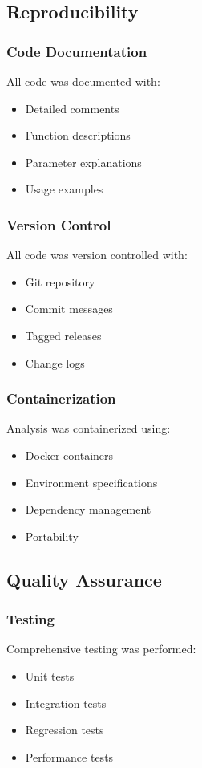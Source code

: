 \subsection{Reproducibility}

\subsubsection{Code Documentation}
All code was documented with:
\begin{itemize}
    \item Detailed comments
    \item Function descriptions
    \item Parameter explanations
    \item Usage examples
\end{itemize}

\subsubsection{Version Control}
All code was version controlled with:
\begin{itemize}
    \item Git repository
    \item Commit messages
    \item Tagged releases
    \item Change logs
\end{itemize}

\subsubsection{Containerization}
Analysis was containerized using:
\begin{itemize}
    \item Docker containers
    \item Environment specifications
    \item Dependency management
    \item Portability
\end{itemize}

\subsection{Quality Assurance}

\subsubsection{Testing}
Comprehensive testing was performed:
\begin{itemize}
    \item Unit tests
    \item Integration tests
    \item Regression tests
    \item Performance tests
\end{itemize}

